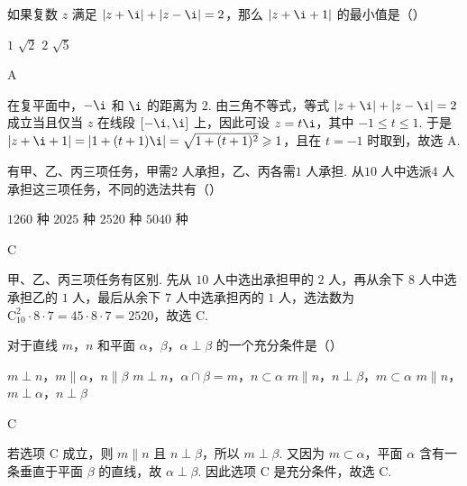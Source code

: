 \documentclass[UTF8,a4paper,oneside,11pt]{ctexbook}
\begin{document}
\begin{problem}
如果复数 \(z\) 满足 \(|z + \i| + |z - \i| = 2\)，那么 \(|z + \i + 1|\) 的最小值是（\quad）

\choices
    {\(1\)}
    {\(\sqrt{2}\)}
    {\(2\)}
    {\(\sqrt{5}\)}
\end{problem}

\begin{answer}
A
\end{answer}

\begin{solution}
在复平面中，\(-\i\) 和 \(\i\) 的距离为 \(2\). 由三角不等式，等式 \(|z+\i|+|z-\i|=2\) 成立当且仅当 \(z\) 在线段 \([-\i,\i]\) 上，因此可设 \(z=t\i\)，其中 \(-1\leqslant t\leqslant1\). 于是
\(|z+\i+1|=|1+(t+1)\i|=\sqrt{1+(t+1)^2}\geqslant1\)，且在 \(t=-1\) 时取到，故选 A.
\end{solution}

\begin{problem}
有甲、乙、丙三项任务，甲需\(2\) 人承担，乙、丙各需\(1\) 人承担. 从\(10\) 人中选派\(4\) 人承担这三项任务，不同的选法共有（\quad）

\choices
    {\(1260\text{ 种}\)}
    {\(2025\text{ 种}\)}
    {\(2520\text{ 种}\)}
    {\(5040\text{ 种}\)}
\end{problem}

\begin{answer}
C
\end{answer}

\begin{solution}
甲、乙、丙三项任务有区别. 先从 \(10\) 人中选出承担甲的 \(2\) 人，再从余下 \(8\) 人中选承担乙的 \(1\) 人，最后从余下 \(7\) 人中选承担丙的 \(1\) 人，选法数为 \(\mathrm C_{10}^{2}\cdot8\cdot7=45\cdot8\cdot7=2520\)，故选 C.
\end{solution}

\begin{problem}
对于直线 \(m\)，\(n\) 和平面 \(\alpha\)，\(\beta\)，\(\alpha \perp \beta\) 的一个充分条件是（\quad）

\choices
    {\(m \perp n\)，\(m \parallel \alpha\)，\(n \parallel \beta\)}
    {\(m \perp n\)，\(\alpha \cap \beta = m\)，\(n \subset \alpha\)}
    {\(m \parallel n\)，\(n \perp \beta\)，\(m \subset \alpha\)}
    {\(m \parallel n\)，\(m \perp \alpha\)，\(n \perp \beta\)}
\end{problem}

\begin{answer}
C
\end{answer}

\begin{solution}
若选项 C 成立，则 \(m\parallel n\) 且 \(n\perp\beta\)，所以 \(m\perp\beta\). 又因为 \(m\subset\alpha\)，平面 \(\alpha\) 含有一条垂直于平面 \(\beta\) 的直线，故 \(\alpha\perp\beta\). 因此选项 C 是充分条件，故选 C.
\end{solution}
\end{document}
